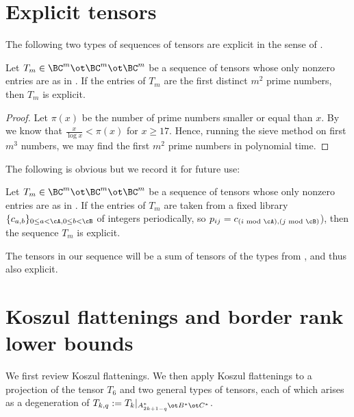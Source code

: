 \documentclass{toc}
\begin{document}
\section{Explicit tensors}\label{subs:whatEX}

The following  two types of sequences of tensors are explicit in the sense of 
.

\begin{lemma}\label{expla} Let $T_m\in \BC^m\ot \BC^m\ot \BC^m$ be a sequence of tensors whose only nonzero entries
are as in .   %
If the entries of $T_m$ are the first distinct $m^2$ prime numbers, then $T_m$ is explicit.
\end{lemma}
\begin{proof}
Let $\pi(x)$ be the number of prime numbers smaller or equal than $x$.  By~\cite{rosser1962approximate}
we know that $\frac{x}{\log x}<\pi(x)$ for $x\geq 17$. Hence, running the sieve method on first $m^3$ numbers, 
we may find the  first $m^2$ prime numbers in polynomial time. 
\end{proof}

The following is obvious but we record it for future use:

\begin{lemma}\label{explb}Let $T_m\in \BC^m\ot \BC^m\ot \BC^m$ be a sequence of tensors whose only nonzero entries
are as in .  %
If the entries of $T_m$ 
are taken from a fixed library $\{ c_{a,b}\}_{0\leq a< \cA, 0\leq b< \cB}$ of
integers periodically, so $p_{ij}=c_{(i\text{ mod }\cA),(j\text{ mod }\cB)}$), then the sequence $T_m$ is explicit.
\end{lemma}
  
The tensors in our  sequence will be a sum of tensors of the types from  , and thus
also explicit.

\section{Koszul  flattenings and border rank lower bounds}\label{kossect}
We first review Koszul flattenings. 
 We then  apply Koszul flattenings to a projection of the tensor $T_6$ and two general types of tensors, each of which
arises as a degeneration  of $T_{k,q}:=T_k|_{A^*_{2k+1-q}\ot B^*\ot C^*}$.
\end{document}
